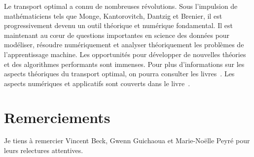 Le transport optimal a connu de nombreuses révolutions. Sous l'impulsion de mathématiciens tels que Monge, Kantorovitch, Dantzig et Brenier, il est progressivement devenu un outil théorique et numérique fondamental. 
%
Il est maintenant au c\oe{}ur de questions importantes en science des données pour modéliser, résoudre numériquement et analyser théoriquement les problèmes de l'apprentissage machine. Les opportunités pour développer de nouvelles théories et des algorithmes performants sont immenses. 
%
Pour plus d'informations sur les aspects théoriques du transport optimal, on pourra consulter les livres~\cite{Villani03,SantambrogioBook}. Les aspects numériques et applicatifs sont couverts dans le livre~\cite{PeyreCuturi}.


\section*{Remerciements}

Je tiens à remercier Vincent Beck, Gwenn Guichaoua et Marie-Noëlle Peyré pour leurs relectures attentives. 


